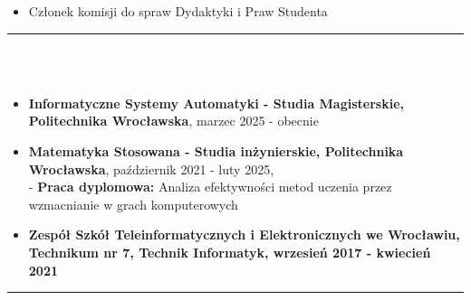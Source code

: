 \documentclass[10pt]{article}
\begin{document}
\begin{paracol}{2}
\begin{rightcolumn}
\begin{itemize}[leftmargin=*]
        \item Członek komisji do spraw Dydaktyki i Praw Studenta
    \end{itemize}
    \rule{11cm}{1pt} \\ \\
    \fontsize{10pt}{10pt}
    \begin{itemize}[leftmargin=*]
        \setlength{\parskip}{0pt}
        \item \textbf{Informatyczne Systemy Automatyki - Studia Magisterskie, Politechnika Wrocławska}, marzec 2025 - obecnie
        \item \textbf{Matematyka Stosowana - Studia inżynierskie, Politechnika Wrocławska}, październik 2021 - luty 2025, \\
        - \textbf{Praca dyplomowa:} Analiza efektywności metod uczenia przez wzmacnianie w grach komputerowych
        \item \textbf{Zespół Szkół Teleinformatycznych i Elektronicznych we Wrocławiu, Technikum nr 7, Technik Informatyk, wrzesień 2017 - kwiecień 2021} 
    \end{itemize}
    \rule{11cm}{1pt} \\ \\
    \fontsize{10pt}{10pt}
    \begin{itemize}[leftmargin=*]
        \setlength{\parskip}{0pt}

\end{itemize}
\end{rightcolumn}
\end{paracol}
\end{document}
